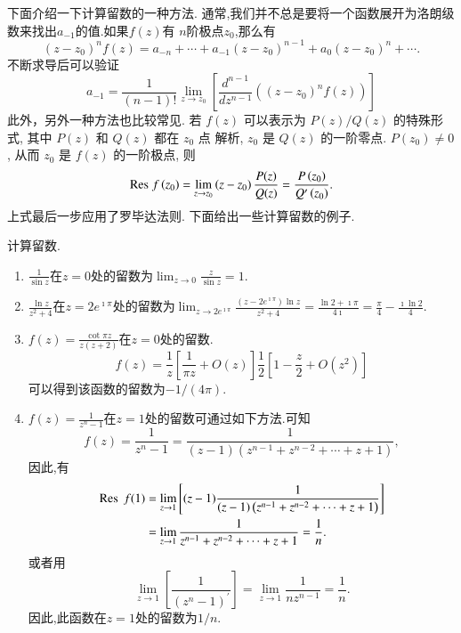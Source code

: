 下面介绍一下计算留数的一种方法.
通常,我们并不总是要将一个函数展开为洛朗级数来找出$a_{-1}$的值.如果$f(z)$有
$n$阶极点$z_0$,那么有
\begin{equation}
    \left(z-z_0\right)^n f(z)=a_{-n}+\cdots+a_{-1}\left(z-z_0\right)^{n-1}+a_0\left(z-z_0\right)^n+\cdots .
\end{equation}
不断求导后可以验证
\begin{equation}
    a_{-1}=\frac{1}{(n-1) !} \lim _{z \to z_0}\left[\frac{d^{n-1}}{d z^{n-1}}\left(\left(z-z_0\right)^n f(z)\right)\right]
\end{equation}
此外，另外一种方法也比较常见. 若 $f(z)$ 可以表示为 $P(z) / Q(z)$ 的特殊形式, 其中 $P(z)$ 和 $Q(z)$ 都在 $z_0$ 点 解析, $z_0$ 是 $Q(z)$ 的一阶零点. $P\left(z_0\right) \neq 0$, 从而 $z_0$ 是 $f(z)$ 的一阶极点, 则
\begin{equation}
    {\mathrm{Res}\;} f\left(z_0\right)=\lim _{z \to z_0}\left(z-z_0\right) \frac{P(z)}{Q(z)}=\frac{P\left(z_0\right)}{Q^{\prime}\left(z_0\right)} .
\end{equation}
上式最后一步应用了罗毕达法则.
下面给出一些计算留数的例子.
\begin{examplebox}{计算留数.}
    
    \begin{enumerate}
        \item $\frac{1}{\sin z}$在$z=0$处的留数为$\lim_{z\to 0} \frac{z}{\sin{z}} = 1$.
        \item $\frac{\ln{z}}{z^2 + 4}$在$z=2e^{\imath \pi}$处的留数为$\lim_{z\to 2e^{\imath \pi}} \frac{(z-2e^{\imath \pi})\ln{z} }{z^2 + 4} = 
        \frac{\ln 2 + \imath \pi}{4\imath} = \frac{\pi}{4} - \frac{\imath\ln{2}}{4}.$
        \item $f(z) = \frac{\cot{\pi z}}{z(z+2)}$在$z=0$处的留数.\\
            $$
              f(z) = \frac{1}{z} \left[\frac{1}{\pi z} + O(z) \right]\frac{1}{2} \left[1 - \frac{z}{2} + O(z^2)\right]  
            $$
            可以得到该函数的留数为$-1/(4\pi)$.
        \item $f(z) = \frac{1}{z^n - 1}$在$z=1$处的留数可通过如下方法.可知
        $$
            f(z)=\frac{1}{z^n-1}=\frac{1}{(z-1)\left(z^{n-1}+z^{n-2}+\cdots+z+1\right)},
        $$
        因此,有
        $$
            \begin{aligned}
                \operatorname{{\mathrm{Res}\;}} f(1) & =\lim _{z \to 1}\left[(z-1) \frac{1}{(z-1)\left(z^{n-1}+z^{n-2}+\cdots+z+1\right)}\right] \\
                & =\lim _{z \to 1} \frac{1}{z^{n-1}+z^{n-2}+\cdots+z+1}=\frac{1}{n} .
            \end{aligned}
        $$
        或者用 $$
        \lim _{z \to 1}\left[\frac{1}{\left(z^n-1\right)^{\prime}}\right]=\lim _{z \to 1} \frac{1}{n z^{n-1}}=\frac{1}{n} .
        $$ 因此,此函数在$z=1$处的留数为$1/n$.
    \end{enumerate}
\end{examplebox}

